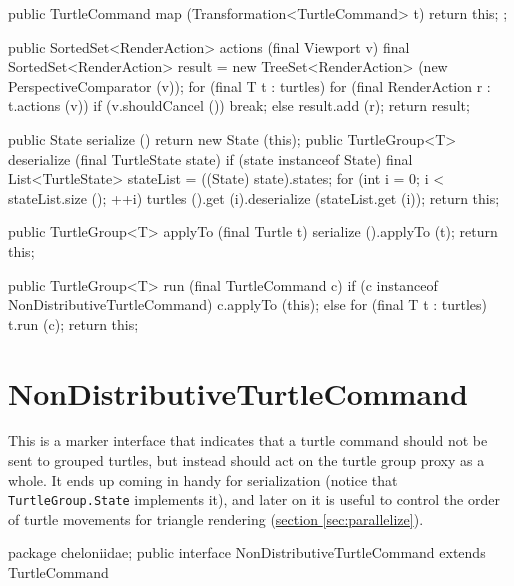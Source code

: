 \documentclass{report}
\newcommand{\Ref}[2]{\hyperref[#2]{#1 \ref*{#2}}}
\begin{document}
\begin{javacode}
{{{      public TurtleCommand map (Transformation<TurtleCommand> t) {return this;}
    };
  }

  public SortedSet<RenderAction> actions (final Viewport v) {
    final SortedSet<RenderAction> result = new TreeSet<RenderAction> (new PerspectiveComparator (v));
    for (final T t : turtles) for (final RenderAction r : t.actions (v)) if (v.shouldCancel ()) break;
                                                                         else                   result.add (r);
    return result;
  }

  public State          serialize   () {return new State (this);}
  public TurtleGroup<T> deserialize (final TurtleState state) {
    if (state instanceof State) {
      final List<TurtleState> stateList = ((State) state).states;
      for (int i = 0; i < stateList.size (); ++i) turtles ().get (i).deserialize (stateList.get (i));
    }
    return this;
  }

  public TurtleGroup<T> applyTo (final Turtle t) {
    serialize ().applyTo (t);
    return this;
  }

  public TurtleGroup<T> run (final TurtleCommand c) {
    if (c instanceof NonDistributiveTurtleCommand) c.applyTo (this);
    else for (final T t : turtles) t.run (c);
    return this;
  }
}
\end{javacode}

\section {NonDistributiveTurtleCommand} \label{sec:nondistributiveturtlecommand}
      This is a marker interface that indicates that a turtle command should not be sent to grouped turtles, but instead should act on the turtle group proxy as
      a whole. It ends up coming in handy for serialization (notice that \verb|TurtleGroup.State| implements it), and later on it is useful to control the order
      of turtle movements for triangle rendering (\Ref{section}{sec:parallelize}).

\begin{javacode}
package cheloniidae;
public interface NonDistributiveTurtleCommand extends TurtleCommand {}
\end{javacode}
\end{document}
